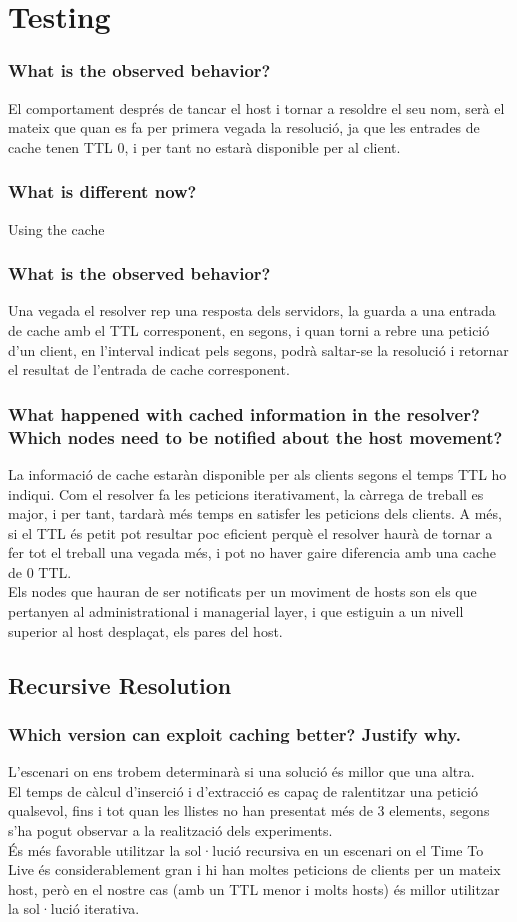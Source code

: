 \documentclass[a4paper, 10pt]{article}
\begin{document}
\section{Testing}
\subsubsection{ What is the observed behavior?}
El comportament després de tancar el host i tornar a resoldre el seu nom, serà el mateix que quan es fa per primera vegada la resolució, ja que les entrades de cache tenen TTL 0, i per tant no estarà disponible per al client.
\subsubsection{ What is different now?}
Using the cache
\subsubsection{ What is the observed behavior?}
Una vegada el resolver rep una resposta dels servidors, la guarda a una entrada de cache amb el TTL corresponent, en segons, i quan torni a rebre una petició d'un client, en l'interval indicat pels segons, podrà saltar-se la resolució i retornar el resultat de l'entrada de cache corresponent.
\subsubsection{ What happened with cached information in the resolver? Which nodes need to be notified about the host movement?}
La informació de cache estaràn disponible per als clients segons el temps TTL ho indiqui. Com el resolver fa les peticions iterativament, la càrrega de treball es major, i per tant, tardarà més temps en satisfer les peticions dels clients. A més, si el TTL és petit pot resultar poc eficient perquè el resolver haurà de tornar a fer tot el treball una vegada més, i pot no haver gaire diferencia amb una cache de 0 TTL.\\
Els nodes que hauran de ser notificats per un moviment de hosts son 
els que pertanyen al administrational i managerial layer, i que estiguin a un nivell superior al host desplaçat, els pares del host.
\subsection{Recursive Resolution}
\subsubsection{ Which version can exploit caching better? Justify why.}
L'escenari on ens trobem determinarà si una solució és millor que una altra.
\\El temps de càlcul d'inserció i d'extracció es capaç de ralentitzar una petició qualsevol, fins i tot quan les llistes no han presentat més de 3 elements, segons s'ha pogut observar a la realització dels experiments.\\
És més favorable utilitzar la sol·lució recursiva en un escenari on el Time To Live és considerablement gran i hi han moltes peticions de clients per un mateix host, però en el nostre cas (amb un TTL menor i molts hosts) és millor utilitzar la sol·lució iterativa.
\end{document}
